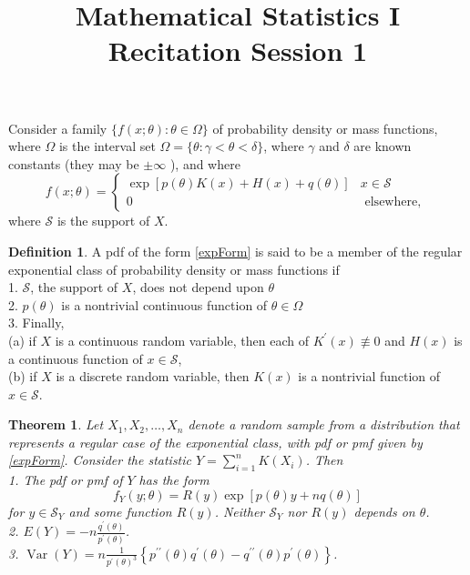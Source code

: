 \documentclass{article}
\title{Mathematical Statistics I\\ Recitation Session 1}
\date{}
\newtheorem*{theorem*}{Theorem}
\theoremstyle{definition}
\newtheorem*{definition*}{Definition}
\begin{document}
	\maketitle
	Consider a family $\{f(x ; \theta): \theta \in \Omega\}$ of probability density or mass functions, where $\Omega$ is the interval set $\Omega=\{\theta: \gamma<\theta<\delta\}$, where $\gamma$ and $\delta$ are known constants (they may be $\pm \infty$ ), and where
	\begin{equation}\label{expForm}
	f(x ; \theta)= \begin{cases}
	\exp [p(\theta) K(x)+H(x)+q(\theta)] & x \in \mathcal{S} \\ 0 & \text { elsewhere, }
	\end{cases}
	\end{equation}
	where $\mathcal{S}$ is the support of $X$.
	\begin{definition*}
	A pdf of the form \eqref{expForm} is said to be a member of the regular exponential class of probability density or mass functions if\\
	1. $\mathcal{S}$, the support of $X$, does not depend upon $\theta$\\
	2. $p(\theta)$ is a nontrivial continuous function of $\theta \in \Omega$\\
	3. Finally,\\
	(a) if $X$ is a continuous random variable, then each of $K^{\prime}(x) \not \equiv 0$ and $H(x)$ is a continuous function of $x \in \mathcal{S}$,\\
	(b) if $X$ is a discrete random variable, then $K(x)$ is a nontrivial function of $x \in \mathcal{S}$.
	\end{definition*}
	
	\begin{theorem*}
		Let $X_1, X_2, \ldots, X_n$ denote a random sample from a distribution that represents a regular case of the exponential class, with pdf or pmf given by \eqref{expForm}. Consider the statistic $Y=\sum_{i=1}^n K\left(X_i\right)$. Then\\
		1. The pdf or pmf of $Y$ has the form
		$$
		f_{Y}\left(y ; \theta\right)=R\left(y\right) \exp \left[p(\theta) y+n q(\theta)\right]
		$$
		for $y \in \mathcal{S}_{Y}$ and some function $R\left(y\right)$. Neither $\mathcal{S}_{Y}$ nor $R\left(y\right)$ depends on $\theta$.\\
		2. $E\left(Y\right)=-n \frac{q^{\prime}(\theta)}{p^{\prime}(\theta)}$.\\
		3. $\operatorname{Var}\left(Y\right)=n \frac{1}{p^{\prime}(\theta)^3}\left\{p^{\prime \prime}(\theta) q^{\prime}(\theta)-q^{\prime \prime}(\theta) p^{\prime}(\theta)\right\}$.
	\end{theorem*}
	
\end{document}
